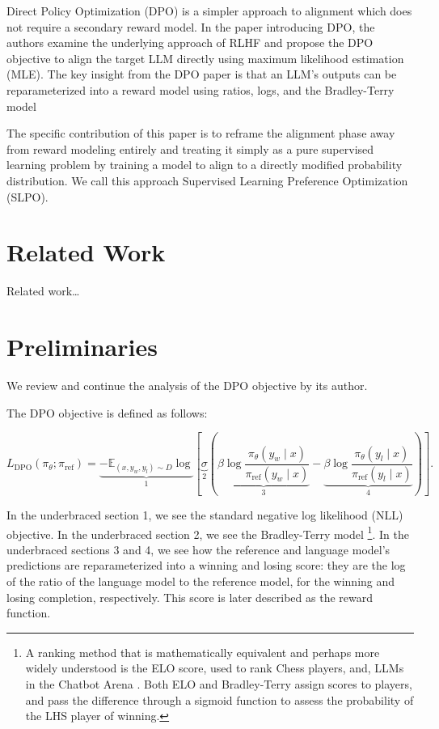 \documentclass[twoside,11pt]{article}
\begin{document}
Direct Policy Optimization (DPO) is a simpler approach to alignment
which does not require a secondary reward model. In the paper introducing
DPO, the authors examine the underlying
approach of RLHF and propose
the DPO objective to align the target LLM directly using
maximum likelihood estimation (MLE). 
The key insight from the DPO paper is that an LLM's
outputs can be reparameterized into a reward model using ratios, logs,
and the Bradley-Terry model \cite{bradley1952rank}

The specific contribution of this paper is to reframe the alignment
phase away from reward modeling entirely and treating it simply as
a pure supervised learning problem by training a model to align to
a directly modified probability distribution. We call this
approach Supervised Learning Preference Optimization (SLPO).

\section{Related Work}

Related work\dots

\section{Preliminaries}

We review and continue the analysis of the DPO objective by its 
author.

The DPO objective is defined as follows:

\begin{equation}
  L_\mathrm{DPO}(\pi_\theta; \pi_\mathrm{ref}) =
  \underbrace{
  -\mathbb{E}_{(x, y_w, y_l) \sim D} 
  \log }_{1} 
  \left[ 
    \underbrace{\sigma }_{2}
    \left(
    \underbrace{\beta \log \frac{\pi_\theta(y_w \mid x)}{\pi_\mathrm{ref}(y_w \mid x)}}_{3}
    - \underbrace{\beta \log \frac{\pi_\theta(y_l \mid x)}{\pi_\mathrm{ref}(y_l \mid x)}}_{4} 
    \right)
  \right].
  \end{equation}  

In the underbraced section 1, we see the standard 
negative log likelihood (NLL) objective.
In the underbraced section 2, we see the Bradley-Terry model 
\footnote{A ranking method that is mathematically equivalent and perhaps more 
widely understood is the ELO score, used to rank Chess players, 
and, LLMs in the Chatbot Arena \cite{elo1978rating,chiang2024chatbot}. 
Both ELO and Bradley-Terry assign scores to players, and 
pass the difference through a sigmoid function to assess the probability of 
the LHS player of winning. }.
In the underbraced sections 3 and 4, we see how the 
reference and language model's predictions are reparameterized
into a winning and losing score: they are the 
log of the ratio of the language model to the reference model, for the winning and 
losing completion, respectively. 
This score is later described as the reward function.
\end{document}
